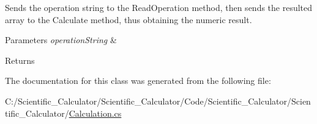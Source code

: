 Sends the operation string to the Read\+Operation method, then sends the resulted array to the Calculate method, thus obtaining the numeric result. 


\begin{DoxyParams}{Parameters}
{\em operation\+String} & \\
\hline
\end{DoxyParams}
\begin{DoxyReturn}{Returns}

\end{DoxyReturn}


The documentation for this class was generated from the following file\+:\begin{DoxyCompactItemize}
\item 
C\+:/\+Scientific\+\_\+\+Calculator/\+Scientific\+\_\+\+Calculator/\+Code/\+Scientific\+\_\+\+Calculator/\+Scientific\+\_\+\+Calculator/\hyperlink{_calculation_8cs}{Calculation.\+cs}\end{DoxyCompactItemize}
